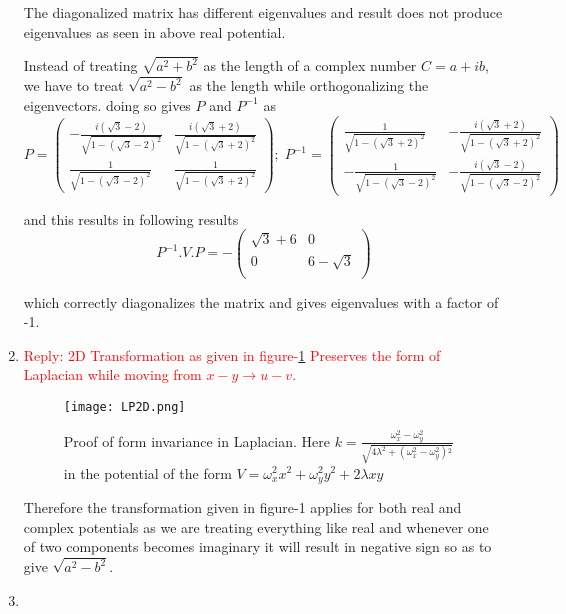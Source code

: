 \documentclass[a4paper, 12pt]{article}
\newcommand{\ans}[1]{\textcolor{red}{#1}}
\newcommand{\boxxx}[1]{%
    \begin{tcolorbox}[colback=orange!10, colframe=gray!50, title=Fixing the error]
        #1
    \end{tcolorbox}%
}
\begin{document}
\begin{enumerate}
{\begin{enumerate}
    The diagonalized matrix has different eigenvalues and result does not produce eigenvalues as seen in above real potential.

    \end{enumerate}
    }


    \boxxx{Instead of treating $\sqrt{a^2+b^2}$ as the length of a complex number $C=a+i b$, we have to treat $\sqrt{a^2-b^2}$ as the length while orthogonalizing the eigenvectors. doing so gives $P$ and $P^{-1}$ as \[ P = \begin{pmatrix} -\frac{i \left(\sqrt{3}-2\right)}{\sqrt{1-\left(\sqrt{3}-2\right)^2}} & \frac{i \left(\sqrt{3}+2\right)}{\sqrt{1-\left(\sqrt{3}+2\right)^2}} \\ \frac{1}{\sqrt{1-\left(\sqrt{3}-2\right)^2}} & \frac{1}{\sqrt{1-\left(\sqrt{3}+2\right)^2}}\end{pmatrix} ;\; P^{-1} = \begin{pmatrix} \frac{1}{\sqrt{1-\left(\sqrt{3}+2\right)^2}} & -\frac{i \left(\sqrt{3}+2\right)}{\sqrt{1-\left(\sqrt{3}+2\right)^2}} \\ -\frac{1}{\sqrt{1-\left(\sqrt{3}-2\right)^2}} & -\frac{i \left(\sqrt{3}-2\right)}{\sqrt{1-\left(\sqrt{3}-2\right)^2}} \end{pmatrix} \]

    and this results in following results
    \[P^{-1}.V.P=-\left(
    \begin{array}{cc}
    \sqrt{3}+6 & 0 \\
    0 & 6-\sqrt{3} \\
    \end{array}
    \right)\]

    which correctly diagonalizes the matrix and gives eigenvalues with a factor of -1.
    }
    \item \ans{Reply: 2D Transformation as given in figure-\ref{fig-2d-L} Preserves the form of Laplacian while moving from $x-y\rightarrow u-v$.}
    

    \begin{figure}[h]
        \centering
        \texttt{[image: LP2D.png]}
        \caption{Proof of form invariance in Laplacian. Here $k=\frac{\omega _x^2-\omega _y^2}{\sqrt{4 \lambda ^2+\left(\omega _x^2-\omega _y^2\right){}^2}}$ in the potential of the form $V=\omega_x^2x^2+\omega_y^2y^2+2\lambda xy$}
        \label{fig-2d-L}
    \end{figure}    
    Therefore the transformation given in figure-1 applies for both real and complex potentials as we are treating everything like real and whenever one of two components becomes imaginary it will result in negative sign so as to give $\sqrt{a^2-b^2}$.


    \item 
\end{enumerate}
\end{document}
